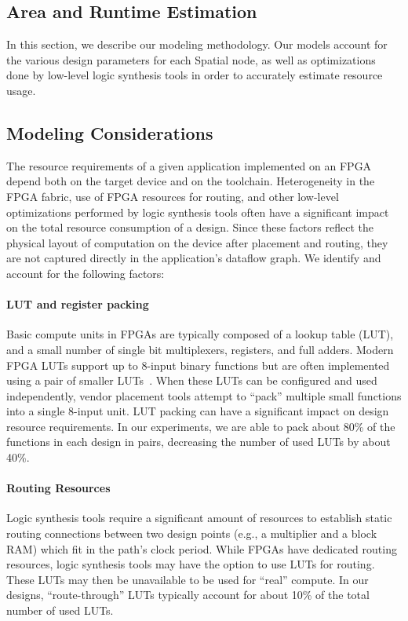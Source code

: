 \subsection{Area and Runtime Estimation}
\label{sec:modeling}
In this section, we describe our modeling methodology. Our models account for the various
design parameters for each Spatial node, as well as optimizations done by low-level logic
synthesis tools in order to accurately estimate resource usage.

\subsection{Modeling Considerations}
\label{ss:modeling-con}
The resource requirements of a given application implemented on an FPGA depend both on the target device and on the toolchain.
Heterogeneity in the FPGA fabric, use of FPGA resources for routing, and other low-level optimizations performed by logic
synthesis tools often have a significant impact on the total resource consumption of a design. Since these factors reflect
the physical layout of computation on the device after placement and routing, they are not captured directly in the application's dataflow graph.
We identify and account for the following factors:

\paragraph{LUT and register packing} Basic compute units in FPGAs are typically composed of a lookup table (LUT), and a small number of single bit multiplexers, registers, and full adders.
  Modern FPGA LUTs support up to 8-input binary functions but are often implemented using a pair of smaller LUTs~\cite{stratixv,virtex7}.
  When these LUTs can be configured and used independently, vendor placement tools attempt to ``pack'' multiple small functions into a single 8-input unit.
  LUT packing can have a significant impact on design resource requirements.
  In our experiments, we are able to pack about 80\% of the functions in each design in pairs, decreasing the number of used LUTs by about 40\%.

\paragraph{Routing Resources} Logic synthesis tools require a significant amount of resources to establish static routing connections
between two design points (e.g., a multiplier and a block RAM) which fit in the path's clock period. While FPGAs have dedicated routing resources,
logic synthesis tools may have the option to use LUTs for routing. These LUTs may then be unavailable to be used for ``real'' compute.
In our designs, ``route-through'' LUTs typically account for about 10\% of the total number of used LUTs.


